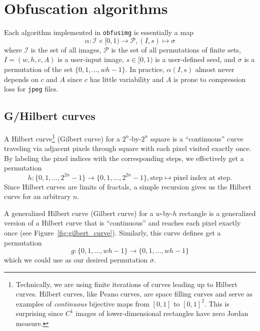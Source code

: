 \documentclass[12pt, a4paper, twoside]{article}
\begin{document}
\section{Obfuscation algorithms}

Each algorithm implemented in \texttt{obfusimg} is essentially a map
\begin{equation}
    \alpha\colon \mathcal{I} \times [0, 1) \to \mathcal{P}, (I, s) \mapsto \sigma
\end{equation}
where $\mathcal{I}$ is the set of all images, $\mathcal{P}$ is the set of all permutations of finite sets, $I = (w, h, c, A)$ is a user-input image, $s \in [0, 1)$ is a user-defined seed, and $\sigma$ is a permutation of the set $\{0, 1, \ldots, w h - 1\}$. In practice, $\alpha(I, s)$ almost never depends on $c$ and $A$ since $c$ has little variability and $A$ is prone to compression loss for \texttt{jpeg} files.

\subsection{G/Hilbert curves}

A Hilbert curve\footnote{Technically, we are using finite iterations of curves leading up to Hilbert curves. Hilbert curves, like Peano curves, are space filling curves and serve as examples of \emph{continuous} bijective maps from $[0, 1]$ to $[0, 1]^2$. This is surprising since $C^1$ images of lower-dimensional rectangles have zero Jordan measure.} (Gilbert curve) for a $2^n$-by-$2^n$ square is a ``continuous'' curve traveling via adjacent pixels through square with each pixel visited exactly once. By labeling the pixel indices with the corresponding steps, we effectively get a permutation
\begin{equation}
    h\colon \{0, 1, \ldots, 2^{2n} - 1\} \to \{0, 1, \ldots, 2^{2n} - 1\}, \text{step} \mapsto \text{pixel index at step}.
\end{equation}
Since Hilbert curves are limits of fractals, a simple recursion gives us the Hilbert curve for an arbitrary $n$.

A generalized Hilbert curve (Gilbert curve) for a $w$-by-$h$ rectangle is a generalized version of a Hilbert curve that is ``continuous'' and reaches each pixel exactly once (see Figure~\ref{fig:gilbert_curve}). Similarly, this curve defines get a permutation
\begin{equation}
    g\colon \{0, 1, \ldots, w h - 1\} \to \{0, 1, \ldots, w h - 1\}
\end{equation}
which we could use as our desired permutation $\sigma$.
\end{document}

